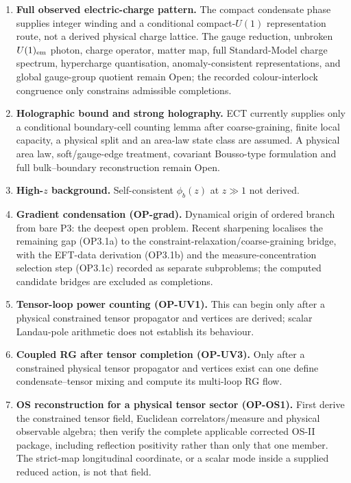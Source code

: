 \documentclass[11pt,a4paper]{article}
\begin{document}
\begin{enumerate}
\item \textbf{Full observed electric-charge pattern.} The compact condensate phase supplies integer winding and a conditional compact-$U(1)$ representation route, not a derived physical charge lattice.  The gauge reduction, unbroken $U(1)_{\rm em}$ photon, charge operator, matter map, full Standard-Model charge spectrum, hypercharge quantisation, anomaly-consistent representations, and global gauge-group quotient remain Open; the recorded colour-interlock congruence only constrains admissible completions.

\item \textbf{Holographic bound and strong holography.} ECT currently supplies only a conditional boundary-cell counting lemma after coarse-graining, finite local capacity, a physical split and an area-law state class are assumed.  A physical area law, soft/gauge-edge treatment, covariant Bousso-type formulation and full bulk--boundary reconstruction remain Open.

\item \textbf{High-$z$ background.} Self-consistent $\phi_b(z)$ at $z \gg 1$ not derived.

\item \textbf{Gradient condensation (OP-grad).} Dynamical origin of ordered branch from bare P3: the deepest open problem. Recent sharpening localises the remaining gap (OP3.1a) to the constraint-relaxation/coarse-graining bridge, with the EFT-data derivation (OP3.1b) and the measure-concentration selection step (OP3.1c) recorded as separate subproblems; the computed candidate bridges are excluded as completions.

\item \textbf{Tensor-loop power counting (OP-UV1).} This can begin only after a physical constrained tensor propagator and vertices are derived; scalar Landau-pole arithmetic does not establish its behaviour.

\item \textbf{Coupled RG after tensor completion (OP-UV3).} Only after a constrained physical tensor propagator and vertices exist can one define condensate--tensor mixing and compute its multi-loop RG flow.

\item \textbf{OS reconstruction for a physical tensor sector (OP-OS1).} First derive the constrained tensor field, Euclidean correlators/measure and physical observable algebra; then verify the complete applicable corrected OS-II package, including reflection positivity rather than only that one member.  The strict-map longitudinal coordinate, or a scalar mode inside a supplied reduced action, is not that field.


\end{enumerate}
\end{document}
